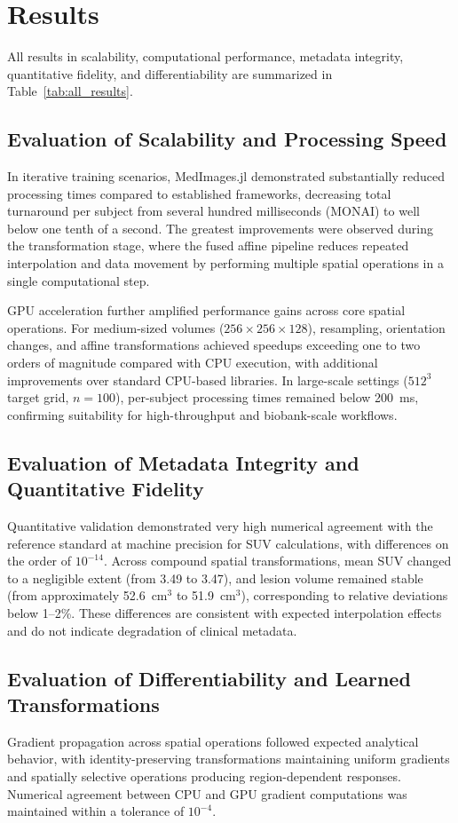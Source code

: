 \documentclass[a4paper,10pt]{elsarticle}
\begin{document}
\section{Results }
All results in scalability, computational performance, metadata integrity, quantitative fidelity, and differentiability are summarized in Table~\ref{tab:all_results}.

\subsection*{Evaluation of Scalability and Processing Speed}
In iterative training scenarios, MedImages.jl demonstrated substantially reduced processing times compared to established frameworks, decreasing total turnaround per subject from several hundred milliseconds (MONAI) to well below one tenth of a second. The greatest improvements were observed during the transformation stage, where the fused affine pipeline reduces repeated interpolation and data movement by performing multiple spatial operations in a single computational step. 

GPU acceleration further amplified performance gains across core spatial operations. For medium-sized volumes ($256 \times 256 \times 128$), resampling, orientation changes, and affine transformations achieved speedups exceeding one to two orders of magnitude compared with CPU execution, with additional improvements over standard CPU-based libraries. In large-scale settings ($512^3$ target grid, $n=100$), per-subject processing times remained below 200~ms, confirming suitability for high-throughput and biobank-scale workflows.

\subsection*{Evaluation of Metadata Integrity and Quantitative Fidelity}
Quantitative validation demonstrated very high numerical agreement with the reference standard at machine precision for SUV calculations, with differences on the order of $10^{-14}$. Across compound spatial transformations, mean SUV changed to a negligible extent (from 3.49 to 3.47), and lesion volume remained stable (from approximately 52.6~cm$^3$ to 51.9~cm$^3$), corresponding to relative deviations below 1--2\%. These differences are consistent with expected interpolation effects and do not indicate degradation of clinical metadata.

\subsection*{Evaluation of Differentiability and Learned Transformations}
Gradient propagation across spatial operations followed expected analytical behavior, with identity-preserving transformations maintaining uniform gradients and spatially selective operations producing region-dependent responses. Numerical agreement between CPU and GPU gradient computations was maintained within a tolerance of $10^{-4}$.
\end{document}
